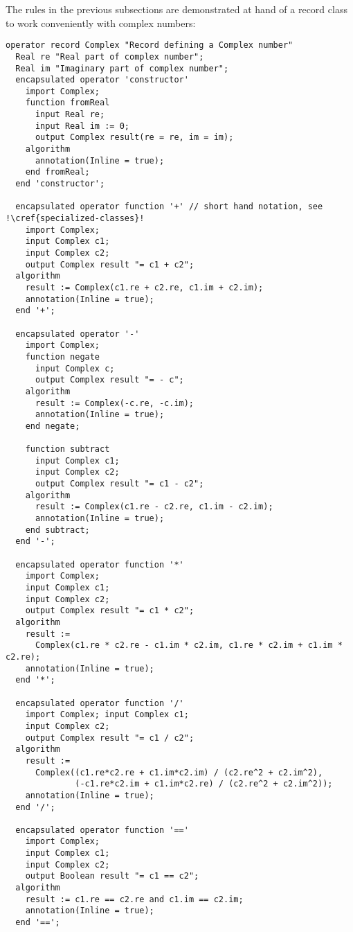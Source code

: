 \begin{example}
The rules in the previous subsections are demonstrated at hand of a record class to work conveniently with complex numbers:
\begin{lstlisting}[language=modelica,escapechar=!]
operator record Complex "Record defining a Complex number"
  Real re "Real part of complex number";
  Real im "Imaginary part of complex number";
  encapsulated operator 'constructor'
    import Complex;
    function fromReal
      input Real re;
      input Real im := 0;
      output Complex result(re = re, im = im);
    algorithm
      annotation(Inline = true);
    end fromReal;
  end 'constructor';

  encapsulated operator function '+' // short hand notation, see !\cref{specialized-classes}!
    import Complex;
    input Complex c1;
    input Complex c2;
    output Complex result "= c1 + c2";
  algorithm
    result := Complex(c1.re + c2.re, c1.im + c2.im);
    annotation(Inline = true);
  end '+';

  encapsulated operator '-'
    import Complex;
    function negate
      input Complex c;
      output Complex result "= - c";
    algorithm
      result := Complex(-c.re, -c.im);
      annotation(Inline = true);
    end negate;

    function subtract
      input Complex c1;
      input Complex c2;
      output Complex result "= c1 - c2";
    algorithm
      result := Complex(c1.re - c2.re, c1.im - c2.im);
      annotation(Inline = true);
    end subtract;
  end '-';

  encapsulated operator function '*'
    import Complex;
    input Complex c1;
    input Complex c2;
    output Complex result "= c1 * c2";
  algorithm
    result :=
      Complex(c1.re * c2.re - c1.im * c2.im, c1.re * c2.im + c1.im * c2.re);
    annotation(Inline = true);
  end '*';

  encapsulated operator function '/'
    import Complex; input Complex c1;
    input Complex c2;
    output Complex result "= c1 / c2";
  algorithm
    result :=
      Complex((c1.re*c2.re + c1.im*c2.im) / (c2.re^2 + c2.im^2),
              (-c1.re*c2.im + c1.im*c2.re) / (c2.re^2 + c2.im^2));
    annotation(Inline = true);
  end '/';

  encapsulated operator function '=='
    import Complex;
    input Complex c1;
    input Complex c2;
    output Boolean result "= c1 == c2";
  algorithm
    result := c1.re == c2.re and c1.im == c2.im;
    annotation(Inline = true);
  end '==';


\end{lstlisting}
\end{example}
